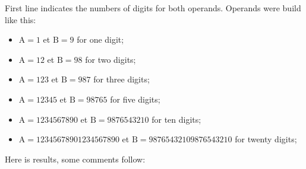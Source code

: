 \documentclass[12pt]{report}
\begin{document}
First line indicates the numbers of digits for both operands.
Operands were build like this:
\begin{itemize}
\item $\mathrm{A} = 1$ et $\mathrm{B} = 9$ for one digit;
\item $\mathrm{A} = 12$ et $\mathrm{B} = 98$ for two digits;
\item $\mathrm{A} = 123$ et $\mathrm{B} = 987$ for three digits;
\item $\mathrm{A} = 12345$ et $\mathrm{B} = 98765$ for five digits;
\item $\mathrm{A} = 1234567890$ et $\mathrm{B} = 9876543210$ for ten
  digits;
\item $\mathrm{A} = 12345678901234567890$ et $\mathrm{B} =
  98765432109876543210$ for twenty digits;
\end{itemize}
Here is results, some comments follow:
\end{document}
